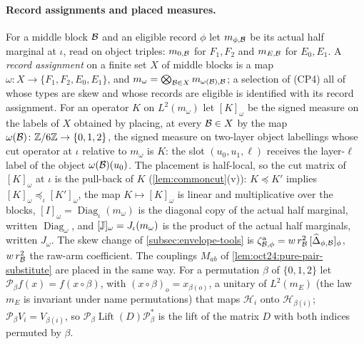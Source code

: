 \paragraph{Record assignments and placed measures.}
For a middle block $\mathcal B$ and an eligible record $\phi$ let $m_{\phi,\mathcal B}$ be
its actual half marginal at $\iota$, read on object triples: $m_{0,\mathcal B}$ for
$F_1,F_2$ and $m_{E,\mathcal B}$ for $E_0,E_1$. A \emph{record assignment} on a finite
set $X$ of middle blocks is a map $\omega\colon X\to\{F_1,F_2,E_0,E_1\}$, and
$m_\omega=\bigotimes_{\mathcal B\in X}m_{\omega(\mathcal B),\mathcal B}$; a selection of (CP4) all of
whose types are skew and whose records are eligible is identified with its
record assignment. For an operator $K$ on $L^2(m_\omega)$ let $[K]_\omega$ be the
signed measure on the labels of $X$ obtained by placing, at every $\mathcal B\in X$ by
the map $\omega(\mathcal B)\colon\mathbb Z/6\mathbb Z\to\{0,1,2\}$, the signed measure on two-layer
object labellings whose cut operator at $\iota$ relative to $m_\omega$ is $K$: the
slot $(u_0,u_1,\ell)$ receives the layer-$\ell$ label of the object
$\omega(\mathcal B)(u_0)$. The placement is half-local, so the cut matrix of
$[K]_\omega$ at $\iota$ is the pull-back of $K$ (\cref{lem:commoncut}(v)):
$K\preceq K'$ implies $[K]_\omega\preceq_\iota[K']_\omega$, the map $K\mapsto[K]_\omega$
is linear and multiplicative over the blocks, $[I]_\omega=\operatorname{Diag}_\iota
(m_\omega)$ is the diagonal copy of the actual half marginal, written
$\operatorname{Diag}_\omega$, and $[\mathbb J]_\omega=J_\iota(m_\omega)$ is the product
of the actual half marginals, written $J_\omega$. The skew change of
\cref{subsec:envelope-tools} is
$\zeta^{\rm a}_{\mathcal B,\phi}=w\,r_\mathcal B^2\,[\widehat\Delta_{\phi,\mathcal B}]_\phi$, $w\,r_\mathcal B^2$ the raw-arm
coefficient. The couplings $M_{ab}$ of \cref{lem:oct24:pure-pair-substitute} are placed
in the same way. For a permutation $\beta$ of $\{0,1,2\}$ let $\mathcal P_\beta f(x)=f(x\circ\beta)$,
with $(x\circ\beta)_o=x_{\beta(o)}$, a unitary of $L^2(m_E)$ (the law $m_E$ is
invariant under name permutations) that maps $\mathcal H_i$ onto $\mathcal H_{\beta(i)}$;
$\mathcal P_\beta V_i=V_{\beta(i)}$, so $\mathcal P_\beta\operatorname{Lift}(D)\mathcal P_\beta^*$ is the lift of
the matrix $D$ with both indices permuted by $\beta$.

